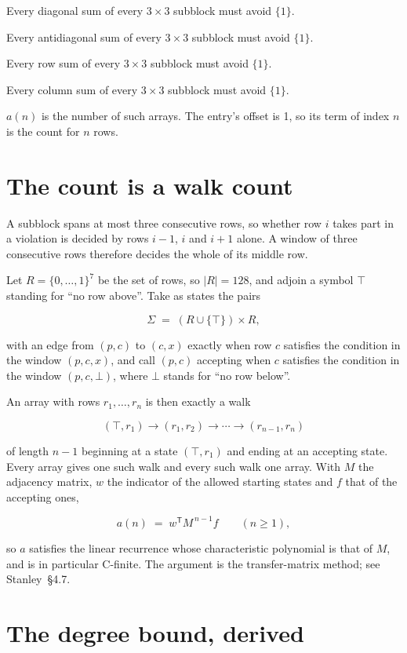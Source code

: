 \documentclass[11pt]{article}
\theoremstyle{definition}
\begin{document}
Every diagonal sum of every $3\times3$ subblock must avoid $\{1\}$.

Every antidiagonal sum of every $3\times3$ subblock must avoid $\{1\}$.

Every row sum of every $3\times3$ subblock must avoid $\{1\}$.

Every column sum of every $3\times3$ subblock must avoid $\{1\}$.

$a(n)$ is the number of such arrays. The entry's offset is 1, so its term of index $n$ is the count for $n$ rows.

\section{The count is a walk count}

A subblock spans at most three consecutive rows, so whether row $i$ takes part in a violation is decided by rows $i-1$, $i$ and $i+1$ alone. A window of three consecutive rows therefore decides the whole of its middle row.

Let $R = \{0,\dots,1\}^{7}$ be the set of rows, so $|R| = 128$, and adjoin a symbol $\top$ standing for ``no row above''. Take as states the pairs

\[\Sigma \;=\; (R \cup \{\top\}) \times R,\]

with an edge from $(p,c)$ to $(c,x)$ exactly when row $c$ satisfies the condition in the window $(p,c,x)$, and call $(p,c)$ accepting when $c$ satisfies the condition in the window $(p,c,\bot)$, where $\bot$ stands for ``no row below''.

An array with rows $r_1,\dots,r_n$ is then exactly a walk

\[(\top,r_1) \to (r_1,r_2) \to \cdots \to (r_{n-1},r_n)\]

of length $n-1$ beginning at a state $(\top,r_1)$ and ending at an accepting state. Every array gives one such walk and every such walk one array. With $M$ the adjacency matrix, $w$ the indicator of the allowed starting states and $f$ that of the accepting ones,

\[a(n) \;=\; w^{\mathsf T} M^{\,n-1} f \qquad (n \ge 1),\]

so $a$ satisfies the linear recurrence whose characteristic polynomial is that of $M$, and is in particular C-finite. The argument is the transfer-matrix method; see Stanley~\S4.7.

\section{The degree bound, derived}
\end{document}
